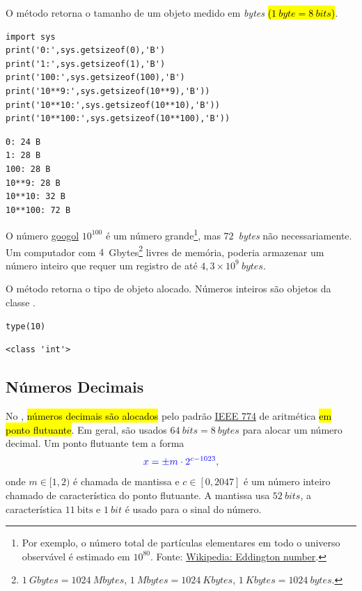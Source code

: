 \begin{ex}
  O método {\python} {\PYTHONsysDOTgetsizeof} retorna o tamanho de um objeto medido em \textit{bytes} \hl{($1~\textit{byte} = 8~\textit{bits}$)}.

\begin{lstlisting}
import sys
print('0:',sys.getsizeof(0),'B')
print('1:',sys.getsizeof(1),'B')
print('100:',sys.getsizeof(100),'B')
print('10**9:',sys.getsizeof(10**9),'B'))
print('10**10:',sys.getsizeof(10**10),'B'))
print('10**100:',sys.getsizeof(10**100),'B'))
\end{lstlisting}

\begin{verbatim}
0: 24 B
1: 28 B
100: 28 B
10**9: 28 B
10**10: 32 B
10**100: 72 B
\end{verbatim}

  O número \href{https://en.wikipedia.org/wiki/Googol}{googol} $10^{100}$ é um número grande\footnote{Por exemplo, o número total de partículas elementares em todo o universo observável é estimado em $10^{80}$. Fonte: \href{https://en.wikipedia.org/wiki/Eddington_number}{Wikipedia: Eddington number}.}, mas $72$~\textit{bytes} não necessariamente. Um computador com $4$~Gbytes\footnote{$1~\textit{Gbytes} = 1024~\textit{Mbytes}$, $1~\textit{Mbytes} = 1024~\textit{Kbytes}$, $1~\textit{Kbytes} = 1024~\textit{bytes}$.} livres de memória, poderia armazenar um número inteiro que requer um registro de até $4,3\times 10^9~\textit{bytes}$.
\end{ex}

\begin{obs}
  O método {\python} {\PYTHONtype} retorna o tipo de objeto alocado. Números inteiros são objetos da classe {\PYTHONint}.

\begin{lstlisting}
type(10)
\end{lstlisting}

\begin{verbatim}
<class 'int'>
\end{verbatim}

\end{obs}

\subsection{Números Decimais}\label{cap_lingua_sec_numop:subsec:float}

No {\python}, \hl{números decimais são alocados} pelo padrão \href{https://en.wikipedia.org/wiki/IEEE\_754}{IEEE 774} de aritmética \hl{em ponto flutuante}. Em geral, são usados $64~\textit{bits} = 8~\textit{bytes}$ para alocar um número decimal. Um ponto flutuante tem a forma
\begin{equation}\color{blue}x = \pm m\cdot 2^{c-1023},
\end{equation}
onde $m\in [1,2)$ é chamada de mantissa e $c\in [0, 2047]$ é um número inteiro chamado de característica do ponto flutuante. A mantissa usa $52~\textit{bits}$, a característica $11~\text{bits}$ e $1~\textit{bit}$ é usado para o sinal do número.

